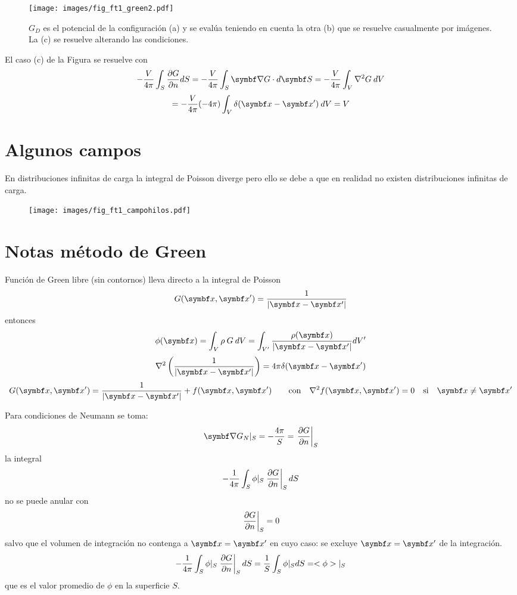 \documentclass[10pt,oneside]{CBFT_book}
\begin{document}
\begin{figure}[htb]
	\begin{center}
	\texttt{[image: images/fig\_ft1\_green2.pdf]}	 
	\end{center}
	\caption{$G_D$ es el potencial de la configuración (a) y se evalúa teniendo en cuenta la
	otra (b) que se resuelve casualmente por imágenes. La (c) se resuelve alterando las condiciones.}
\end{figure} 

El caso (c) de la Figura se resuelve con 
\[
	-\frac{V}{4\pi} \int_S \dpar{G}{n} dS = -\frac{V}{4\pi} \int_S \Nabla G\cdot d\vb{S} =
	-\frac{V}{4\pi} \int_V \lapm{G} \: dV	
\]
\[
	= -\frac{V}{4\pi} (-4\pi)\int_V \delta(\vb{x}-\vb{x}') \: dV	= V 
\]

\section{Algunos campos}

En distribuciones infinitas de carga la integral de Poisson diverge pero ello se debe a que en
realidad no existen distribuciones infinitas de carga.
\begin{figure}[thb]
	\begin{center}
	\texttt{[image: images/fig\_ft1\_campohilos.pdf]}	 
	\end{center}
	\caption{}
\end{figure} 

\section{Notas método de Green}

Función de Green libre (sin contornos) lleva directo a la integral de Poisson
\[
	G(\vb{x}, \vb{x}') = \frac{1}{|\vb{x} - \vb{x}'|}
\]
entonces 
\[
	\phi(\vb{x}) = \int_V \rho \:G \:dV = \int_{V'} \frac{ \rho(\vb{x}) }{|\vb{x}-\vb{x}'|} dV'
\]
\[
	\nabla^2 \left( \frac{1}{|\vb{x} - \vb{x}'|} \right) = 4\pi \delta(\vb{x}-\vb{x}')
\]
\[
	G(\vb{x}, \vb{x}') =  \frac{1}{|\vb{x} - \vb{x}'|} + f(\vb{x}, \vb{x}') \qquad 
	\textrm{con} \quad \lapm{f}(\vb{x}, \vb{x}') = 0 \quad \textrm{si} \quad \vb{x}\neq\vb{x}'
\]

Para condiciones de Neumann se toma:
\[
	\Nabla G_N|_S = -\frac{4\pi}{S} = \left. \dpar{G}{n} \right|_S
\]
la integral 
\[
	- \frac{1}{4\pi} \int_S \phi|_S \left.\frac{\partial^{\hspace{-0.05em}} {G}}{\partial {n}^{\hspace{-0.05em}}}\right|_S  dS
\]
no se puede anular con 
\[
	\left.\frac{\partial^{\hspace{-0.05em}} {G}}{\partial {n}^{\hspace{-0.05em}}}\right|_S = 0
\]
salvo que el volumen de integración no contenga a $\vb{x}=\vb{x}'$ en cuyo caso:
se excluye $\vb{x}=\vb{x}'$ de la integración.
\[
	- \frac{1}{4\pi} \int_S \phi|_S \left.\frac{\partial^{\hspace{-0.05em}} {G}}{\partial {n}^{\hspace{-0.05em}}}\right|_S  dS =
	\frac{1}{S} \int_S \phi|_S dS = <\phi>|_S
\]
que es el valor promedio de $\phi$ en la superficie $S$.
\end{document}
